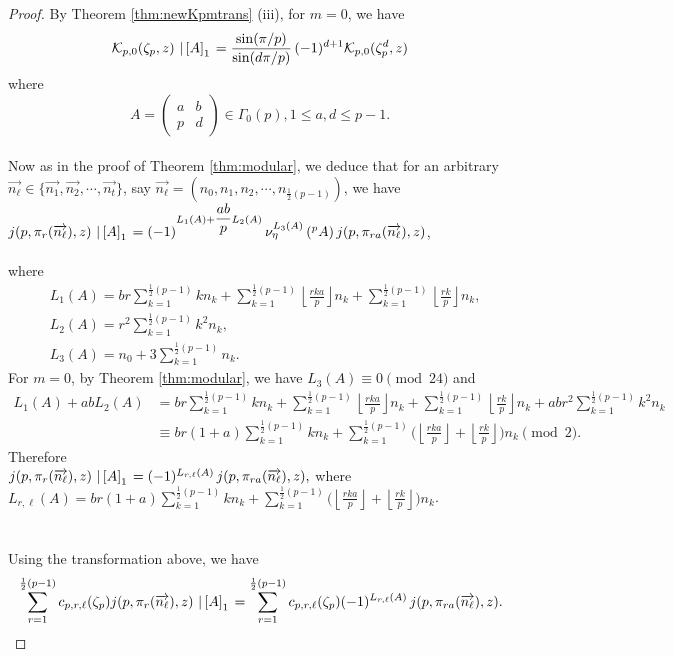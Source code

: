 \documentclass[12pt]{amsart}
\theoremstyle{definition}
\theoremstyle{remark}
\numberwithin{equation}{section}
\newcommand\Lpar[1]{\left(#1\right)}
\newcommand\FL[1]{\left\lfloor#1\right\rfloor}
\newcommand\strokeb[2]{\,\left\arrowvert\,\left[#1\right]_#2\right.}
\newcommand\stroke[3]{#1\,\left\arrowvert\,\left[#2\right]_{#3}\right.}
\newcommand\thm[1]{\ref{thm:#1}}
\begin{document}
\begin{proof}
By Theorem \thm{newKpmtrans} (iii), for $m=0$, we have
\\
$$\mathcal{K}_{p,0}(\zeta_p,z)\strokeb{A}{1}=\frac{\sin(\pi/p)}{\sin(d\pi/p)}\,(-1)^{d+1}\mathcal{K}_{p,0}(\zeta_p^d,z)$$ where 
$$A = \begin{pmatrix}
      a & b \\ p & d 
    \end{pmatrix}
\in \Gamma_0(p), 1 \leq a,d \leq p-1.
$$ 
\\
Now as in the proof of Theorem \thm{modular}, we deduce that for an arbitrary $\overrightarrow{n_{\ell}}\in \{\overrightarrow{n_1},\overrightarrow{n_2},\cdots,\overrightarrow{n_t}\}$, say $\overrightarrow{n_{\ell}}=(n_0,n_1,n_2,\cdots ,n_{\frac{1}{2}(p-1)})$, we have 
\\
$j(p,\pi_r(\overrightarrow{n_{\ell}}),z)\stroke{}{A}{1}=(-1)^{L_1(A)+\dfrac{a b}{p}L_2(A)}\,\nu_{\eta}^{L_3(A)}\Lpar{{}^pA}j(p,\pi_{ra}(\overrightarrow{n_{\ell}}),z)$,
\\\\
where
\begin{align*}
&L_{1}(A)=br\sum_{k=1}^{\frac{1}{2}(p-1)}kn_{k}+\sum_{k=1}^{\frac{1}{2}(p-1)}\FL{\frac{rka}{p}} n_{k}+\sum_{k=1}^{\frac{1}{2}(p-1)}\FL{\frac{rk}{p}} n_{k},
\\
&L_{2}(A)=r^2\sum_{k=1}^{\frac{1}{2}(p-1)}k^2n_{k},
\\
&L_{3}(A)=n_0+3\sum_{k=1}^{\frac{1}{2}(p-1)}n_{k}.
\end{align*}
For $m=0$, by Theorem \thm{modular}, we have  $L_{3}(A)\equiv 0 \pmod{24}$ and 
\begin{align*}
L_{1}(A)+abL_2(A)&=br\sum_{k=1}^{\frac{1}{2}(p-1)}kn_{k}+\sum_{k=1}^{\frac{1}{2}(p-1)}\FL{\frac{rka}{p}} n_{k}+\sum_{k=1}^{\frac{1}{2}(p-1)}\FL{\frac{rk}{p}} n_{k}+abr^2\sum_{k=1}^{\frac{1}{2}(p-1)}k^2n_{k}
\\
&\equiv br(1+a)\sum_{k=1}^{\frac{1}{2}(p-1)}kn_{k}+\sum_{k=1}^{\frac{1}{2}(p-1)}\Big(\FL{\frac{rka}{p}}+\FL{\frac{rk}{p}}\Big) n_{k} \pmod{2}.
\end{align*}
Therefore
\\
$j(p,\pi_r(\overrightarrow{n_{\ell}}),z)\stroke{}{A}{1}=(-1)^{L_{r,\ell}(A)}\,j(p,\pi_{ra}(\overrightarrow{n_{\ell}}),z),$ where
$L_{r,\ell}(A)=br(1+a)\sum\limits_{k=1}^{\frac{1}{2}(p-1)}kn_{k}+\sum\limits_{k=1}^{\frac{1}{2}(p-1)}\Big(\FL{\frac{rka}{p}}+\FL{\frac{rk}{p}}\Big) n_{k}$.
\\\\\\
Using the transformation above, we have
\begin{align*}
&\sum_{r=1}^{\frac{1}{2}(p-1)}c_{p,r,{\ell}}(\zeta_p)j(p,\pi_r(\overrightarrow{n_{\ell}}),z)\strokeb{A}{1}=\sum_{r=1}^{\frac{1}{2}(p-1)}c_{p,r,\ell}(\zeta_p)(-1)^{L_{r,\ell}(A)}\,j(p,\pi_{ra}(\overrightarrow{n_{\ell}}),z).\\
\end{align*}


\end{proof}
\end{document}
